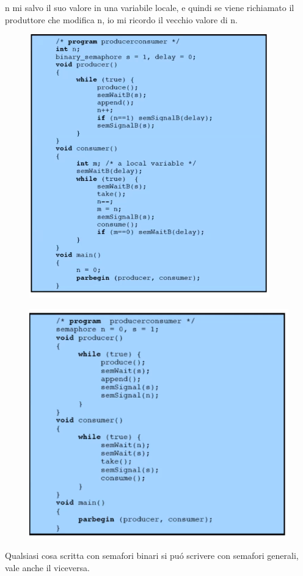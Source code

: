 n mi salvo il suo valore in una variabile locale, e quindi se viene richiamato il produttore che modifica n, io mi ricordo il vecchio valore di n.
\begin{figure}[H]
    \centering
    \includegraphics[width=0.7\linewidth]{immagini/SoluzioneProduttoreConsumatoreCorretta}
\end{figure}
\begin{figure}[H]
    \centering
    \includegraphics[width=0.7\linewidth]{immagini/SoluzioneProduttoreConSemaforiGenerali}
\end{figure}
Qualsiasi cosa scritta con semafori binari si puó scrivere con semafori generali, vale anche il viceversa.















































